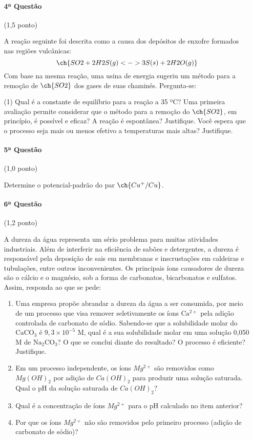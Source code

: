 \documentclass[12pt,a4paper]{article}
\begin{document}
\paragraph{4ª Questão} (1,5 ponto)

A reação seguinte foi descrita como a causa dos depósitos de enxofre formados nas regiões vulcânicas:$$\ch{SO2 + 2 H2S (g) <-> 3 S (s) + 2 H2O (g)}$$Com base na mesma reação, uma usina de energia sugeriu um método para a remoção de $\ch{SO2}$ dos gases de suas chaminés. Pergunta-se:
\begin{tasks}(1)
\task Qual é a constante de equilíbrio para a reação a 35 ºC?
\task Uma primeira avaliação permite considerar que o método para a remoção do $\ch{SO2}$, em princípio, é possível e eficaz? A reação é espontânea? Justifique.
\task Você espera que o processo seja mais ou menos efetivo a temperaturas mais altas? Justifique.
\end{tasks}

\paragraph{5ª Questão} (1,0 ponto)

Determine o potencial-padrão do par $\ch{Cu^+ / Cu}$.

\paragraph{6ª Questão} (1,2 ponto)

A dureza da água representa um sério problema para muitas atividades industriais. Além de interferir na eficiência de sabões e detergentes, a dureza é responsável pela deposição de sais em membranas e inscrustações em caldeiras e tubulações, entre outros inconvenientes. Os principais íons causadores de dureza são o cálcio e o magnésio, sob a forma de carbonatos, bicarbonatos e sulfatos. Assim, responda ao que se pede:

\begin{enumerate}[label=(\alph*)]
\item Uma empresa propõe abrandar a dureza da água a ser consumida, por meio de um processo que visa remover seletivamente os íons $\mathrm{Ca^{2+}}$ pela adição controlada de carbonato de sódio. Sabendo-se que a solubilidade molar do $\mathrm{CaCO_3}$ é $9,3 \times 10^{-5}$ M, qual é a sua solubilidade molar em uma solução 0,050 M de $\mathrm{Na_2CO_3}$? O que se conclui diante do resultado? O processo é eficiente? Justifique.
\item Em um processo independente, os íons $Mg^{2+}$ são removidos como $Mg(OH)_2$ por adição de $Ca(OH)_2$ para produzir uma solução saturada. Qual o pH da solução saturada de $Ca(OH)_2$?
\item Qual é a concentração de íons $Mg^{2+}$ para o pH calculado no item anterior? 
\item Por que os íons $Mg^{2+}$ não são removidos pelo primeiro processo (adição de carbonato de sódio)?
\end{enumerate}
\end{document}

